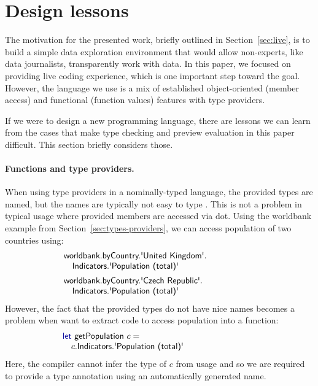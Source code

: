 \documentclass[sigplan,10pt]{acmart}\settopmatter{printfolios=true,printccs=false,printacmref=false}
\theoremstyle{plain}
\theoremstyle{definition}
\newcommand{\ident}[1]{\textnormal{\sffamily #1}}
\newcommand{\kvd}[1]{\textnormal{\textcolor{kvdclr}{\sffamily #1}}}
\begin{document}

\section{Design lessons}
\label{sec:design}

The motivation for the presented work, briefly outlined in Section~\ref{sec:live}, is to build a 
simple data exploration environment that would allow non-experts, like data journalists, 
transparently work with data. In this paper, we focused on providing live coding experience, 
which is one important step toward the goal. However, the language we use is a mix of established 
object-oriented (member access) and functional (function values) features with type providers.

If we were to design a new programming language, there are lessons we can learn from the 
cases that make type checking and preview evaluation in this paper difficult. This section 
briefly considers those. 

\paragraph{Functions and type providers.} When using type providers in a nominally-typed language,
the provided types are named, but the names are typically not easy to type \cite{fsdata}. This is
not a problem in typical usage where provided members are accessed via dot. Using the \ident{worldbank}
example from Section~\ref{sec:types-providers}, we can access population of two countries using:
%
\begin{equation*}
\begin{array}{l}
\ident{worldbank.byCountry.\textquotesingle United Kingdom\textquotesingle}.\\
\quad \ident{Indicators.\textquotesingle Population (total)\textquotesingle}\\[0.5em]
\ident{worldbank.byCountry.\textquotesingle Czech Republic\textquotesingle}.\\
\quad \ident{Indicators.\textquotesingle Population (total)\textquotesingle}\hspace{9em}
\end{array}
\end{equation*}
%
However, the fact that the provided types do not have nice names becomes a problem when want to 
extract code to access population into a function:
%
\begin{equation*}
\begin{array}{l}
\kvd{let}~\ident{getPopulation}~c=\\
\quad c.\ident{Indicators.\textquotesingle Population (total)\textquotesingle}\hspace{8.5em}
\end{array}
\end{equation*}
%
Here, the compiler cannot infer the type of $c$ from usage and so we are required to provide a
type annotation using an automatically generated name.
\end{document}
